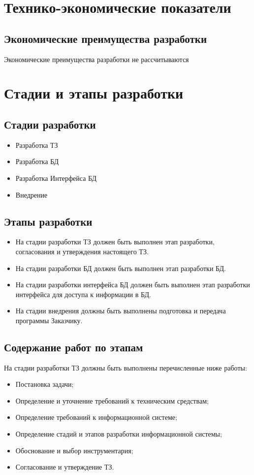 \section{Технико-экономические показатели}
  \subsection{Экономические преимущества разработки}
    Экономические преимущества разработки не рассчитываются 
\section{Стадии и этапы разработки}
  \subsection{Стадии разработки}
   \begin{itemize}
    \item Разработка ТЗ
    \item Разработка БД
    \item Разработка Интерфейса БД
    \item Внедрение
  \end{itemize}
  \subsection{Этапы разработки}
  \begin{itemize}
    \item На стадии разработки ТЗ должен быть выполнен этап разработки, согласования и утверждения настоящего ТЗ.
    \item На стадии разработки БД должен быть выполнен этап разработки БД.
    \item На стадии разработки интерфейса БД должен быть выполнен этап разработки интерфейса для доступа к информации в БД.
    \item На стадии внедрения должны быть выполнены подготовка и передача программы Заказчику.
  \end{itemize}
  
  \subsection{Содержание работ по этапам}
    На стадии разработки ТЗ должны быть выполнены перечисленные ниже работы:
      \begin{itemize}
        \item Постановка задачи;
        \item Определение и уточнение требований к техническим средствам;
        \item Определение требований к информационной системе;
        \item Определение стадий и этапов разработки информационной системы;
        \item Обоснование и выбор инструментария;
        \item Согласование и утверждение ТЗ.
      \end{itemize}
      
